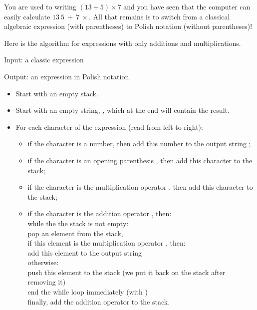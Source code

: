\documentclass[11pt,class=report,crop=false]{standalone}
\begin{document}
\begin{activite}

 
 
You are used to writing \og{}$(13+5) \times 7$\fg{} and you have seen that the computer can easily calculate \og{}$13 \  5 \ + \ 7 \ \times$\fg{}. All that remains is to switch from a classical algebraic expression (with parentheses) to Polish notation (without parentheses)!

  Here is the algorithm for expressions with only additions and multiplications. 
 
  \begin{algorithme}
  Input: a classic expression

  Output: an expression in Polish notation

  \begin{itemize}
    \item Start with an empty stack.  
    
    \item Start with an empty string, , which at the end will contain the result.
   
   \item For each character of the expression (read from left to right):
   \begin{itemize} 
     \item if the character is a number, then add this number to the output string ;
     
     \item if the character is an opening parenthesis , then add this character to the stack;
     
     \item if the character is the multiplication operator , then add this character to the stack;  
        
     \item if the character is the addition operator , then: \\
     while the the stack is not empty: \\
     \indentation pop an element from the stack, \\
     \indentation if this element is the multiplication operator , then: \\
     \indentation \indentation add this element   to the output string \\
     \indentation otherwise: \\
     \indentation \indentation push this element   to the stack (we put it back on the stack after removing it)\\
     \indentation \indentation end the \og{}while\fg{} loop immediately  (with )\\              
     finally, add the  addition operator to the stack.


\end{itemize}
\end{itemize}
\end{algorithme}
\end{activite}
\end{document}

